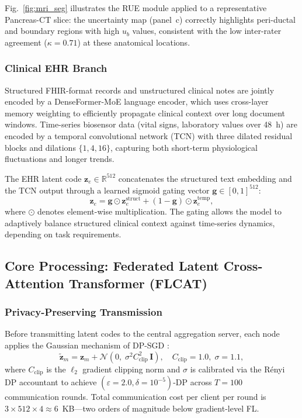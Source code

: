 \documentclass[a4paper,fleqn]{cas-dc}
\begin{document}
Fig.~\ref{fig:mri_seg} illustrates the RUE module applied to a representative
Pancreas-CT slice: the uncertainty map (panel~c) correctly highlights
peri-ductal and boundary regions with high $u_b$ values, consistent with the
low inter-rater agreement ($\kappa\!=\!0.71$) at these anatomical locations.

\subsubsection{Clinical EHR Branch}

Structured FHIR-format records and unstructured clinical notes are jointly
encoded by a DenseFormer-MoE \citep{denseformer2024} language encoder, which
uses cross-layer memory weighting to efficiently propagate clinical context
over long document windows. Time-series biosensor data (vital signs, laboratory
values over 48~h) are encoded by a temporal convolutional network (TCN) with
three dilated residual blocks and dilations $\{1,4,16\}$, capturing both
short-term physiological fluctuations and longer trends.

The EHR latent code $\mathbf{z}_e \in \mathbb{R}^{512}$ concatenates the
structured text embedding and the TCN output through a learned sigmoid gating
vector $\mathbf{g} \in [0,1]^{512}$:
\begin{equation}
\mathbf{z}_e = \mathbf{g} \odot \mathbf{z}_e^{\text{struct}} +
(1-\mathbf{g}) \odot \mathbf{z}_e^{\text{temp}},
\label{eq:ehr_gate}
\end{equation}
where $\odot$ denotes element-wise multiplication. The gating allows the model
to adaptively balance structured clinical context against time-series dynamics,
depending on task requirements.

\subsection{Core Processing: Federated Latent Cross-Attention Transformer (FLCAT)}
\label{subsec:flcat}

\subsubsection{Privacy-Preserving Transmission}

Before transmitting latent codes to the central aggregation server, each node
applies the Gaussian mechanism of DP-SGD \citep{abadi2016dpsgd}:
\begin{equation}
\tilde{\mathbf{z}}_m = \mathbf{z}_m +
\mathcal{N}\!\left(0,\;\sigma^2 C_{\mathrm{clip}}^2\,\mathbf{I}\right),
\quad C_{\mathrm{clip}}\!=\!1.0,\;\sigma\!=\!1.1,
\label{eq:dp}
\end{equation}
where $C_{\mathrm{clip}}$ is the $\ell_2$ gradient clipping norm and $\sigma$
is calibrated via the R\'{e}nyi DP accountant \citep{mironov2017renyi} to
achieve $(\varepsilon\!=\!2.0,\delta\!=\!10^{-5})$-DP across $T\!=\!100$
communication rounds. Total communication cost per client per round is
$3\!\times\!512\!\times\!4\!\approx\!6$~KB---two orders of magnitude below
gradient-level FL.
\end{document}
